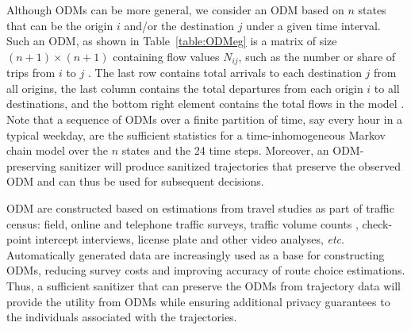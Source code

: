 \documentclass[times,twocolumn,final,authoryear]{elsarticle}
\begin{document}
Although ODMs can be more general, we consider an ODM based on $n$ states that can be the origin $i$ and/or the destination $j$ under a given time interval. 
Such an ODM, as shown in Table~\ref{table:ODMeg} is a matrix of size $(n+1) \times (n+1)$ containing flow values $N_{ij}$, such as the number or share of trips from $i$ to $j$ \citep{Rodrigue2009}.  
The last row contains total arrivals to each destination $j$ from all origins, the last column contains the total departures from each origin $i$ to all destinations, and the bottom right element contains the total flows in the model 
\citep{EVANS1970}. 
Note that a sequence of ODMs over a finite partition of time, say every hour in a typical weekday, are the sufficient statistics for a time-inhomogeneous Markov chain model over the $n$ states and the 24 time steps. 
Moreover, an ODM-preserving sanitizer will produce sanitized trajectories that preserve the observed ODM and can thus be used for subsequent decisions.

\begin{table}[]
\caption{An Origin Destination Matrix from a spatial interaction survey}
\centering

\label{table:ODMeg} 
\end{table}

ODM are constructed based on estimations from travel studies as part of traffic census: field, online and telephone traffic surveys, traffic volume counts \citep{robillard1975}, check-point intercept interviews, license plate and other video analyses, {\it etc}.  
Automatically generated data \citep[e.g. CDR]{iqbal2014} are increasingly used as a base for constructing ODMs, reducing survey costs and improving accuracy of route choice estimations. 
Thus, a sufficient sanitizer that can preserve the ODMs from trajectory data will provide the utility from ODMs while ensuring additional privacy guarantees to the individuals associated with the trajectories. 
\end{document}
